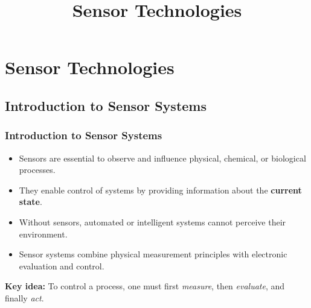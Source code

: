 \title[Sensor Technologies]{Sensor Technologies}
\section{Sensor Technologies}  


\subsection{Introduction to Sensor Systems}

\begin{frame}
	\frametitle{Introduction to Sensor Systems}
    \begin{itemize}
        \item Sensors are essential to observe and influence physical, chemical, or biological processes.
        \item They enable control of systems by providing information about the \textbf{current state}.
        \item Without sensors, automated or intelligent systems cannot perceive their environment.
        \item Sensor systems combine physical measurement principles with electronic evaluation and control.
    \end{itemize}
    \vspace{2mm}
    \textbf{Key idea:} To control a process, one must first \textit{measure}, then \textit{evaluate}, and finally \textit{act}.
\end{frame}

